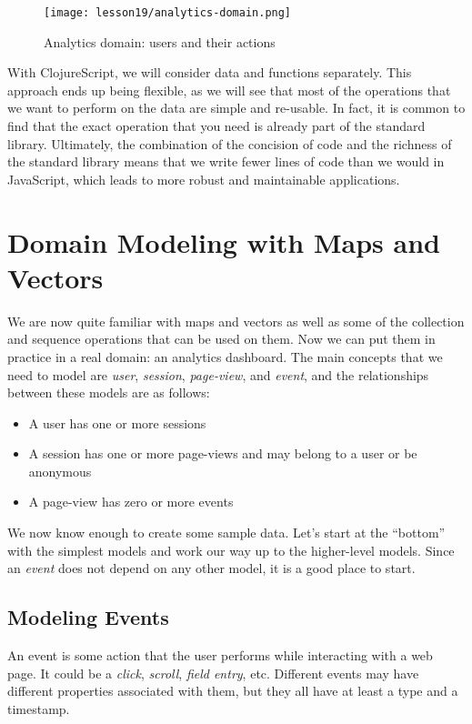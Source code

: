 \documentclass[10pt,twoside,openright]{memoir}
\begin{document}
\begin{figure}[H]
\caption{Analytics domain: users and their actions}
\centering
\texttt{[image: lesson19/analytics-domain.png]}
\end{figure}

With ClojureScript, we will consider data and functions separately. This
approach ends up being flexible, as we will see that most of the
operations that we want to perform on the data are simple and re-usable.
In fact, it is common to find that the exact operation that you need is
already part of the standard library. Ultimately, the combination of the
concision of code and the richness of the standard library means that we
write fewer lines of code than we would in JavaScript, which leads to
more robust and maintainable applications.


\section{Domain Modeling with Maps and Vectors}

We are now quite familiar with maps and vectors as well as some of the
collection and sequence operations that can be used on them. Now we can
put them in practice in a real domain: an analytics dashboard. The main
concepts that we need to model are \emph{user}, \emph{session},
\emph{page-view}, and \emph{event}, and the relationships between these
models are as follows:

\begin{itemize}
\tightlist
\item
  A user has one or more sessions
\item
  A session has one or more page-views and may belong to a user or be
  anonymous
\item
  A page-view has zero or more events
\end{itemize}

We now know enough to create some sample data. Let's start at the
``bottom'' with the simplest models and work our way up to the
higher-level models. Since an \emph{event} does not depend on any other
model, it is a good place to start.


\subsection{Modeling Events}

An event is some action that the user performs while interacting with a
web page. It could be a \emph{click}, \emph{scroll}, \emph{field entry},
etc. Different events may have different properties associated with
them, but they all have at least a type and a timestamp.
\end{document}
